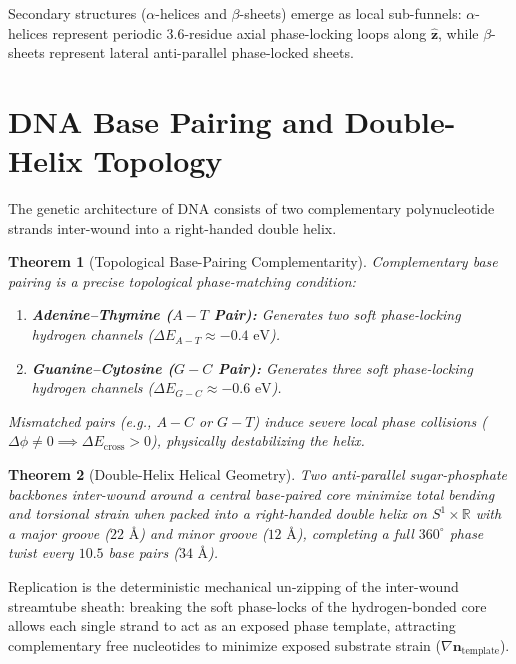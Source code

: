 \documentclass[11pt,a4paper]{article}
\newtheorem{thm}{Theorem}
\begin{document}
	Secondary structures ($\alpha$-helices and $\beta$-sheets) emerge as local sub-funnels: $\alpha$-helices represent periodic $3.6$-residue axial phase-locking loops along $\hat{\mathbf{z}}$, while $\beta$-sheets represent lateral anti-parallel phase-locked sheets.
	
	\section{DNA Base Pairing and Double-Helix Topology}
	\label{sec:dna_mechanics}
	
	The genetic architecture of DNA consists of two complementary polynucleotide strands inter-wound into a right-handed double helix.
	
	\begin{thm}[Topological Base-Pairing Complementarity]
		\label{thm:dna_base_pairing}
		Complementary base pairing is a precise topological phase-matching condition:
		\begin{enumerate}
			\item \textbf{Adenine--Thymine ($A-T$ Pair):} Generates two soft phase-locking hydrogen channels ($\Delta E_{A-T} \approx -0.4 \text{ eV}$).
			\item \textbf{Guanine--Cytosine ($G-C$ Pair):} Generates three soft phase-locking hydrogen channels ($\Delta E_{G-C} \approx -0.6 \text{ eV}$).
		\end{enumerate}
		Mismatched pairs (e.g., $A-C$ or $G-T$) induce severe local phase collisions ($\Delta \phi \neq 0 \implies \Delta E_{\text{cross}} > 0$), physically destabilizing the helix.
	\end{thm}
	
	\begin{thm}[Double-Helix Helical Geometry]
		\label{thm:double_helix_geometry}
		Two anti-parallel sugar-phosphate backbones inter-wound around a central base-paired core minimize total bending and torsional strain when packed into a right-handed double helix on $S^1 \times \mathbb{R}$ with a major groove ($22 \text{ \AA}$) and minor groove ($12 \text{ \AA}$), completing a full $360^\circ$ phase twist every $10.5$ base pairs ($34 \text{ \AA}$).
	\end{thm}
	
	Replication is the deterministic mechanical un-zipping of the inter-wound streamtube sheath: breaking the soft phase-locks of the hydrogen-bonded core allows each single strand to act as an exposed phase template, attracting complementary free nucleotides to minimize exposed substrate strain ($\nabla \mathbf{n}_{\text{template}}$).
	
\end{document}
